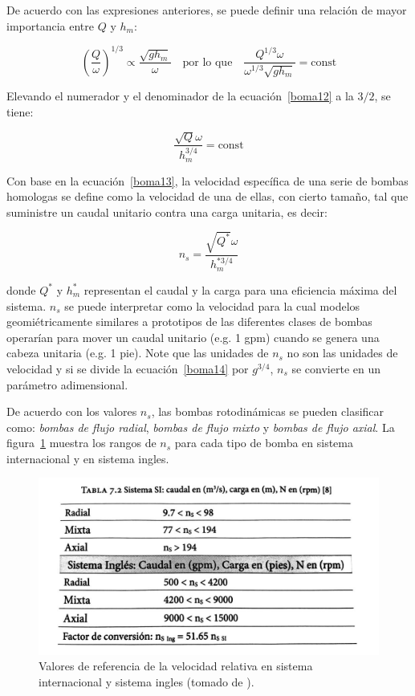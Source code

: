 \documentclass[11pt, oneside]{article}
\begin{document}
De acuerdo con las expresiones anteriores, se puede definir una relaci\'on de mayor importancia entre $Q$ y $h_m$:

\begin{equation}
\left( \frac{Q}{\omega} \right)^{1/3} \propto \frac{\sqrt{g h_m}}{\omega} \quad \text{por lo que} \quad \frac{Q^{1/3} \omega}{\omega^{1/3} \sqrt{g h_m}} = \text{const}
\label{boma12}
\end{equation}

Elevando el numerador y el denominador de la ecuaci\'on~\ref{boma12} a la $3/2$, se tiene:

\begin{equation}
 \frac{\sqrt{Q} \omega}{ h_m^{3/4}} = \text{const}
\label{boma13}
\end{equation}

Con base en la ecuaci\'on~\ref{boma13}, la velocidad espec\'ifica de una serie de bombas homologas se define como la velocidad de una de ellas, con cierto tama\~no, tal que suministre un caudal unitario contra una carga unitaria, es decir:

\begin{equation}
n_s= \frac{\sqrt{Q^*} \omega}{ h_m^{*3/4}}
\label{boma14}
\end{equation}

donde $Q^*$ y $h_m^*$ representan el caudal y la carga para una eficiencia m\'axima del sistema. $n_s$ se puede interpretar como la velocidad para la cual modelos geomi\'etricamente similares a prototipos de las diferentes clases de bombas operar\'ian para mover un caudal unitario (e.g. 1 gpm) cuando se genera una cabeza unitaria (e.g. 1 pie). Note que las unidades de $n_s$ no son las unidades de velocidad y si se divide la ecuaci\'on~\ref{boma14} por $g^{3/4}$, $n_s$ se convierte en un par\'ametro adimensional.

De acuerdo con los valores $n_s$, las bombas rotodin\'amicas se pueden clasificar como: \emph{bombas de flujo radial}, \emph{bombas de flujo mixto} y \emph{bombas de flujo axial}.  La figura~\ref{bom10} muestra los rangos de $n_s$ para cada tipo de bomba en sistema internacional y en sistema ingles.

\begin{figure}[h]
\centering
\includegraphics[width=12cm]{./figs/bom10.jpeg}
\caption{Valores de referencia de la velocidad relativa en sistema internacional y sistema ingles (tomado de \cite{agudelo2011mecanica}).} 
\label{bom10}
\end{figure}
\end{document}

